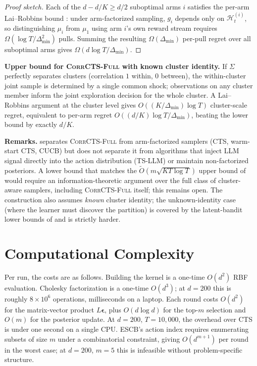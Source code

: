 \documentclass{article}
\theoremstyle{plain}
\theoremstyle{definition}
\theoremstyle{remark}
\newcommand{\gap}{\Delta_{\min}}
\newcommand{\CorrFull}{\textsc{CorrCTS-Full}}
\begin{document}
\begin{proof}[Proof sketch]
Each of the $d - d/K \geq d/2$ suboptimal arms $i$ satisfies the per-arm Lai--Robbins bound \citep{lai1985asymptotically}: under arm-factorized sampling, $g_i$ depends only on $\mathcal{H}_t^{(i)}$, so distinguishing $\mu_i$ from $\mu_1$ using arm $i$'s own reward stream requires $\Omega(\log T / \gap^2)$ pulls.
Summing the resulting $\Omega(\gap)$ per-pull regret over all suboptimal arms gives $\Omega(d \log T / \gap)$.
\end{proof}

\textbf{Upper bound for \CorrFull{} with known cluster identity.}
If $\Sigma$ perfectly separates clusters (correlation $1$ within, $0$ between), the within-cluster joint sample is determined by a single common shock; observations on any cluster member inform the joint exploration decision for the whole cluster.
A Lai--Robbins argument at the cluster level gives $O((K/\gap)\log T)$ cluster-scale regret, equivalent to per-arm regret $O((d/K)\log T / \gap)$, beating the lower bound by exactly $d/K$.

\textbf{Remarks.}
 separates \CorrFull{} from arm-factorized samplers (CTS, warm-start CTS, CUCB) but does not separate it from algorithms that inject LLM signal directly into the action distribution (TS-LLM) or maintain non-factorized posteriors.
A lower bound that matches the $\tilde O(m\sqrt{KT\log T})$ upper bound of  would require an information-theoretic argument over the full class of cluster-aware samplers, including \CorrFull{} itself; this remains open.
The construction also assumes \emph{known} cluster identity; the unknown-identity case (where the learner must discover the partition) is covered by the latent-bandit lower bounds of \citet{hong2020latent} and is strictly harder.

\section{Computational Complexity}\label{app:complexity}

Per run, the costs are as follows.
Building the kernel is a one-time $O(d^2)$ RBF evaluation.
Cholesky factorization is a one-time $O(d^3)$; at $d=200$ this is roughly $8{\times}10^6$ operations, milliseconds on a laptop.
Each round costs $O(d^2)$ for the matrix-vector product $L\boldsymbol\epsilon$, plus $O(d \log d)$ for the top-$m$ selection and $O(m)$ for the posterior update.
At $d=200$, $T=10{,}000$, the overhead over CTS is under one second on a single CPU.
ESCB's action index requires enumerating subsets of size $m$ under a combinatorial constraint, giving $O(d^{m+1})$ per round in the worst case; at $d=200$, $m=5$ this is infeasible without problem-specific structure.
\end{document}
